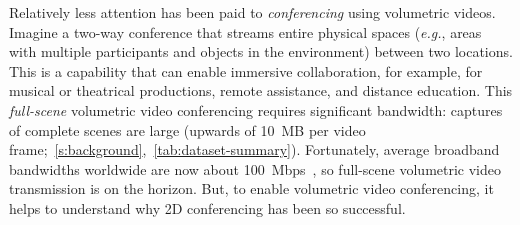 %
Relatively less attention has been paid to \textit{conferencing} using volumetric videos.
%
Imagine a two-way conference that streams entire physical spaces 
(\textit{e.g.}, areas with multiple participants and objects in the environment) between two locations.
%
%
%
This is a capability that can enable immersive collaboration, for example, for musical or theatrical productions, remote assistance, and distance education.
%
This \textit{full-scene} volumetric video conferencing requires significant bandwidth: captures of complete scenes are large (upwards of 10~MB per video frame;~\cref{s:background},~\cref{tab:dataset-summary}).
%
Fortunately, average broadband bandwidths worldwide are now about 100~Mbps~\cite{cisco_whitepaper}, so full-scene volumetric video transmission is on the horizon.
%
But, to enable volumetric video conferencing, it helps to understand why 2D conferencing has been so successful.
%


